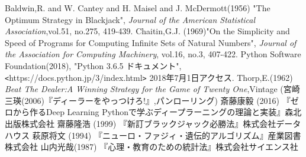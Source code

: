 \begin{thebibliography}{9}
   Baldwin,R. and W. Cantey and H. Maisel and J. McDermott(1956) "The Optimum Strategy in Blackjack", {\it{Journal of the American Statistical Association}},vol.51, no.275, 419-439.
   Chaitin,G.J. (1969)"On the Simplicity and Speed of Programs for Computing Infinite Sets of Natural Numbers", {\it{Journal of the Association for Computing Machinery}}, vol.16, no.3, 407-422.
   Python Software Foundation(2018), "Python 3.6.5 ドキュメント", \verb|<|https://docs.python.jp/3/index.html\verb|>| 2018年7月1日アクセス.
   Thorp,E.(1962) {\it{Beat The Dealer:A Winning Strategy for the Game of Twenty One}},Vintage (宮崎三瑛(2006)『ディーラーをやっつけろ!』,パンローリング)
   斎藤康毅 (2016) 『ゼロから作るDeep Learning Pythonで学ぶディープラーニングの理論と実装』森北出版株式会社
   齋藤隆浩 (1999) 『新訂ブラックジャック必勝法』株式会社データハウス
   萩原将文 (1994) 『ニューロ・ファジィ・遺伝的アルゴリズム』産業図書株式会社
   山内光哉(1987) 『心理・教育のための統計法』株式会社サイエンス社
\end{thebibliography}
